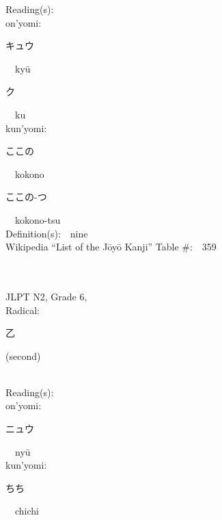 \begin{multicols}{2}
Reading(s):\ \ \\
{\hspace*{1em}}on'yomi:\ \ \\
{\hspace*{2em}}{\begin{CJK}{UTF8}{min} キュウ \end{CJK}}\ \ ky\=u\ \ \\
{\hspace*{2em}}{\begin{CJK}{UTF8}{min} ク \end{CJK}}\ \ ku\ \ \\
{\hspace*{1em}}kun'yomi:\ \ \\
{\hspace*{2em}}{\begin{CJK}{UTF8}{min} ここの \end{CJK}}\ \ kokono\ \ \\
{\hspace*{2em}}{\begin{CJK}{UTF8}{min} ここの-つ \end{CJK}}\ \ kokono-tsu\ \ \\
Definition(s):\ \ nine \\
Wikipedia ``List of the J\=oy\=o Kanji'' Table \#:\ \ 359 \\
\ \ \\
{\fontsize{34pt}{40pt}  }\ \ \\  %
{JLPT N2, Grade 6, \\Radical:\ \ {\begin{CJK}{UTF8}{min} 乙 \end{CJK}} (second) } \\
Reading(s):\ \ \\
{\hspace*{1em}}on'yomi:\ \ \\
{\hspace*{2em}}{\begin{CJK}{UTF8}{min} ニュウ \end{CJK}}\ \ ny\=u\ \ \\
{\hspace*{1em}}kun'yomi:\ \ \\
{\hspace*{2em}}{\begin{CJK}{UTF8}{min} ちち \end{CJK}}\ \ chichi\ \ \\

\end{multicols}
